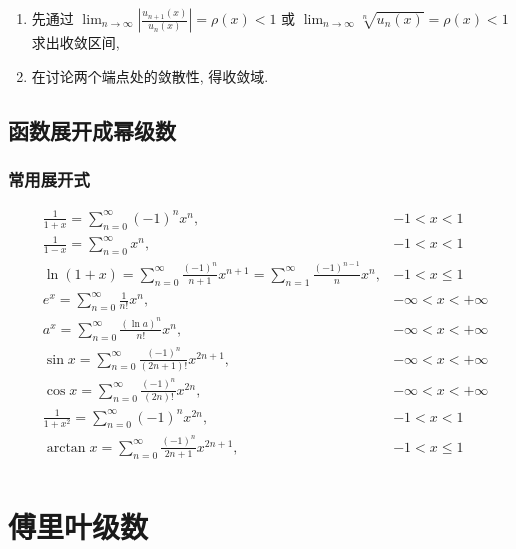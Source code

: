 \begin{enumerate}
    \item 先通过 $\lim_{n\to\infty} |\frac{u_{n+1}(x)}{u_{n}(x)}| = \rho(x) < 1$ 或 $\lim_{n\to\infty} \sqrt[n]{u_n(x)} = \rho(x) < 1$ 求出收敛区间,
    \item 在讨论两个端点处的敛散性, 得收敛域.
\end{enumerate}

\subsection{函数展开成幂级数}

\subsubsection{常用展开式}

\begin{align*}
    & \frac{1}{1+x} = \sum_{n=0}^{\infty} (-1)^{n} x^{n}, & -1 < x < 1 \\
    & \frac{1}{1-x} = \sum_{n=0}^{\infty} x^{n}, & -1 < x < 1 \\
    & \ln(1+x) = \sum_{n=0}^{\infty} \frac{(-1)^n}{n+1} x^{n+1} = \sum_{n=1}^{\infty} \frac{(-1)^{n-1}}{n} x^{n}, & -1 < x \leq 1 \\
    & e^x = \sum_{n=0}^{\infty} \frac{1}{n!} x^{n}, & -\infty < x < +\infty \\
    & a^x = \sum_{n=0}^{\infty} \frac{(\ln a)^n}{n!} x^{n}, & -\infty < x < +\infty \\
    & \sin x = \sum_{n=0}^{\infty} \frac{(-1)^{n}}{(2n+1)!} x^{2n+1}, & -\infty < x < +\infty \\
    & \cos x = \sum_{n=0}^{\infty} \frac{(-1)^{n}}{(2n)!} x^{2n}, & -\infty < x < +\infty \\
    & \frac{1}{1+x^2} = \sum_{n=0}^{\infty} (-1)^{n} x^{2n}, & -1 < x < 1 \\
    & \arctan x = \sum_{n=0}^{\infty} \frac{(-1)^{n}}{2n+1} x^{2n+1}, & -1 < x \leq 1 \\
\end{align*}

\section{傅里叶级数}
